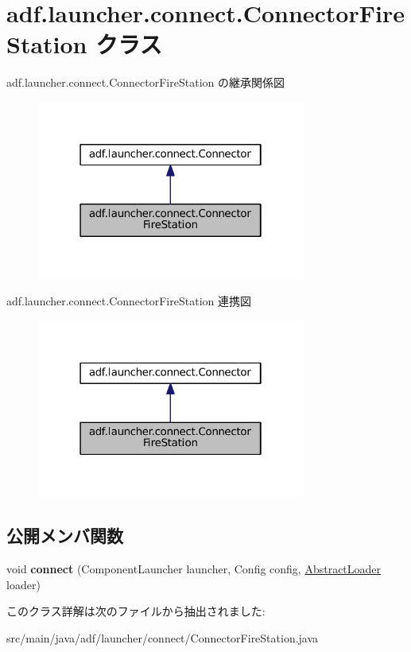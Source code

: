 \hypertarget{classadf_1_1launcher_1_1connect_1_1ConnectorFireStation}{}\section{adf.\+launcher.\+connect.\+Connector\+Fire\+Station クラス}
\label{classadf_1_1launcher_1_1connect_1_1ConnectorFireStation}


adf.\+launcher.\+connect.\+Connector\+Fire\+Station の継承関係図
\nopagebreak
\begin{figure}[H]
\begin{center}
\leavevmode
\includegraphics[width=250pt]{classadf_1_1launcher_1_1connect_1_1ConnectorFireStation__inherit__graph}
\end{center}
\end{figure}


adf.\+launcher.\+connect.\+Connector\+Fire\+Station 連携図
\nopagebreak
\begin{figure}[H]
\begin{center}
\leavevmode
\includegraphics[width=250pt]{classadf_1_1launcher_1_1connect_1_1ConnectorFireStation__coll__graph}
\end{center}
\end{figure}
\subsection*{公開メンバ関数}
\begin{DoxyCompactItemize}
\item 
\hypertarget{classadf_1_1launcher_1_1connect_1_1ConnectorFireStation_add7763c53218ab2336b6a5f5873790aa}{}\label{classadf_1_1launcher_1_1connect_1_1ConnectorFireStation_add7763c53218ab2336b6a5f5873790aa} 
void {\bfseries connect} (Component\+Launcher launcher, Config config, \hyperlink{classadf_1_1component_1_1AbstractLoader}{Abstract\+Loader} loader)
\end{DoxyCompactItemize}


このクラス詳解は次のファイルから抽出されました\+:\begin{DoxyCompactItemize}
\item 
src/main/java/adf/launcher/connect/Connector\+Fire\+Station.\+java\end{DoxyCompactItemize}
